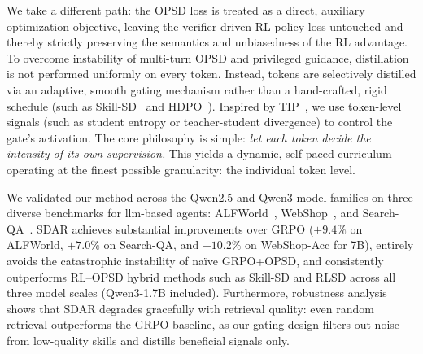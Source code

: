 \documentclass{article} %
\newcommand{\methodname}{\textsc{SDAR}\xspace}
\begin{document}
We take a different path: the OPSD loss is treated as a direct, auxiliary optimization objective, leaving the verifier-driven RL policy loss untouched and thereby strictly preserving the semantics and unbiasedness of the RL advantage. To overcome instability of multi-turn OPSD and privileged guidance, distillation is not performed uniformly on every token. Instead, tokens are selectively distilled via an adaptive, smooth gating mechanism rather than a hand-crafted, rigid schedule (such as Skill-SD~\citep{wang2026skillsd} and HDPO~\citep{ding2026hdpo}). Inspired by TIP~\citep{xu2026tip}, we use token-level signals (such as student entropy or teacher-student divergence) to control the gate's activation. The core philosophy is simple: \emph{let each token decide the intensity of its own supervision.}
This yields a dynamic, self-paced curriculum operating at the finest possible granularity: the individual token level.

We validated our method across the Qwen2.5 and Qwen3 model families on three diverse benchmarks for llm-based agents: ALFWorld~\citep{shridhar2020alfworld}, WebShop~\citep{yao2022webshop}, and Search-QA~\citep{jin2025searchr1}. \methodname{} achieves substantial improvements over GRPO ($+9.4\%$ on ALFWorld, $+7.0\%$ on Search-QA, and $+10.2\%$ on WebShop-Acc for 7B), entirely avoids the catastrophic instability of na\"ive GRPO+OPSD, and consistently outperforms RL--OPSD hybrid methods such as Skill-SD and RLSD across all three model scales (Qwen3-1.7B included). Furthermore, robustness analysis shows that \methodname{} degrades gracefully with retrieval quality: even random retrieval outperforms the GRPO baseline, as our gating design filters out noise from low-quality skills and distills beneficial signals only. 
\end{document}

